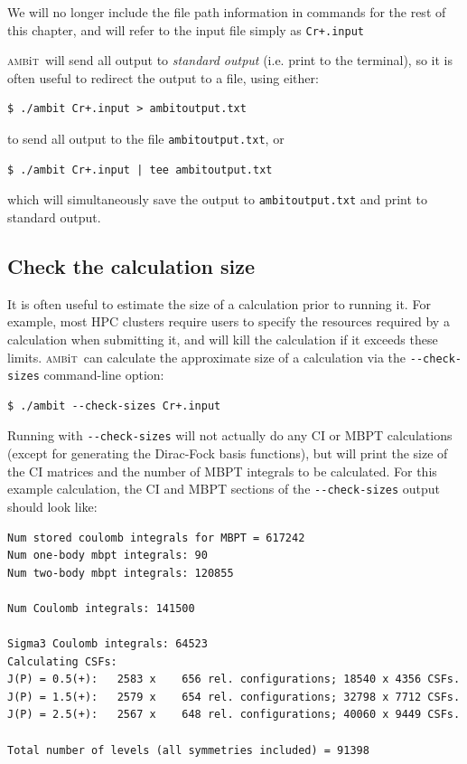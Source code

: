 \documentclass{report}
\newcommand{\ambit}{\textsc{amb}{\footnotesize i}\textsc{t}}
\begin{document}
We will no longer include the file path information in commands for the rest of this chapter, and will
refer to the input file simply as \texttt{Cr+.input}

\ambit\  will send all output to \textit{standard output} (i.e. print to the terminal), so it is often
useful to redirect the output to a file, using either:

\begin{verbatim}
$ ./ambit Cr+.input > ambitoutput.txt
\end{verbatim}

to send all output to the file \texttt{ambitoutput.txt}, or
\begin{verbatim}
$ ./ambit Cr+.input | tee ambitoutput.txt
\end{verbatim}

which will simultaneously save the output to \texttt{ambitoutput.txt} and print to standard output.

\subsection{Check the calculation size}

It is often useful to estimate the size of a calculation prior to running it. For example, most HPC 
clusters require users to specify the resources required by a calculation when submitting it, and will
kill the calculation if it exceeds these limits. \ambit\  can calculate the approximate size of a
calculation via the \texttt{{-}{-}check-sizes} command-line option:

\begin{verbatim}
$ ./ambit --check-sizes Cr+.input
\end{verbatim}

Running with \texttt{{-}{-}check-sizes} will not actually do any CI or MBPT calculations (except for
generating the Dirac-Fock basis functions), but will print the size of the CI matrices and the number of
MBPT integrals to be calculated. For this example calculation, the CI and MBPT sections of the
\texttt{{-}{-}check-sizes} output should look like:

\begin{verbatim}
Num stored coulomb integrals for MBPT = 617242
Num one-body mbpt integrals: 90
Num two-body mbpt integrals: 120855

Num Coulomb integrals: 141500

Sigma3 Coulomb integrals: 64523
Calculating CSFs: 
J(P) = 0.5(+):   2583 x    656 rel. configurations; 18540 x 4356 CSFs.
J(P) = 1.5(+):   2579 x    654 rel. configurations; 32798 x 7712 CSFs.
J(P) = 2.5(+):   2567 x    648 rel. configurations; 40060 x 9449 CSFs.

Total number of levels (all symmetries included) = 91398
\end{verbatim}
\end{document}

